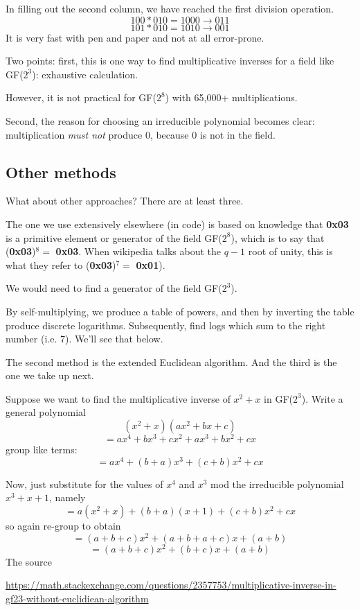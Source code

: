 \documentclass[11pt, oneside]{article}
\begin{document}
In filling out the second column, we have reached the first division operation.
\[ 100 * 010 = 1000 \rightarrow 011 \]
\[ 101 * 010 = 1010 \rightarrow 001 \]
It is very fast with pen and paper and not at all error-prone.

Two points:  first, this is one way to find multiplicative inverses for a field like GF($2^3$):  exhaustive calculation.  

However, it is not practical for GF($2^8$) with 65,000+ multiplications.

Second, the reason for choosing an irreducible polynomial becomes clear:  multiplication \emph{must not} produce $0$, because $0$ is not in the field.

\subsection*{Other methods}
What about other approaches?  There are at least three.

The one we use extensively elsewhere (in code) is based on knowledge that \textbf{0x03} is a primitive element or generator of the field GF($2^8$), which is to say that (\textbf{0x03})$^8 =$ \textbf{0x03}.  When wikipedia talks about the $q-1$ root of unity, this is what they refer to (\textbf{0x03})$^7 =$ \textbf{0x01}).

We would need to find a generator of the field GF($2^3$).

By self-multiplying, we produce a table of powers, and then by inverting the table produce discrete logarithms.  Subsequently, find logs which sum to the right number (i.e. 7).  We'll see that below.

The second method is the extended Euclidean algorithm.  And the third is the one we take up next.

Suppose we want to find the multiplicative inverse of $x^2 + x$ in GF($2^3$).  Write a general polynomial
\[ (x^2 + x) (ax^2 + bx + c) \]
\[ = ax^4 + bx^3 + cx^2 + ax^3 + bx^2 + cx \]
group like terms:
\[ = ax^4 + (b + a)x^3 + (c + b)x^2 + cx \]

Now, just substitute for the values of $x^4$ and $x^3$ mod the irreducible polynomial $x^3 + x + 1$, namely
\[ =  a(x^2 + x) + (b + a)(x + 1) + (c + b)x^2 + cx \]
so again re-group to obtain
\[ = (a + b + c)x^2 + (a + b  + a + c)x + (a + b) \]
\[ = (a + b + c)x^2 + (b  + c)x + (a + b) \]
The source 

\url{https://math.stackexchange.com/questions/2357753/multiplicative-inverse-in-gf23-without-euclidiean-algorithm}
\end{document}

